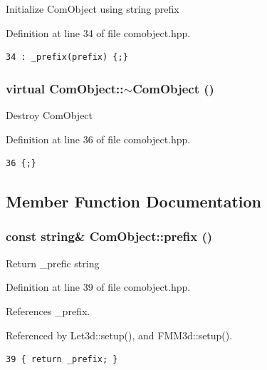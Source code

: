 Initialize Com\-Object using string prefix 

Definition at line 34 of file comobject.hpp.

\footnotesize\begin{verbatim}34 : _prefix(prefix) {;}
\end{verbatim}\normalsize 


\subsubsection{\setlength{\rightskip}{0pt plus 5cm}virtual Com\-Object::$\sim$Com\-Object ()\hspace{0.3cm}{\tt  [inline, virtual]}}\label{classComObject_cf63f06cbc455a408453fe3d9d3dea0a_cf63f06cbc455a408453fe3d9d3dea0a}


Destroy Com\-Object 

Definition at line 36 of file comobject.hpp.

\footnotesize\begin{verbatim}36 {;}
\end{verbatim}\normalsize 




\subsection{Member Function Documentation}
\subsubsection{\setlength{\rightskip}{0pt plus 5cm}const string\& Com\-Object::prefix ()\hspace{0.3cm}{\tt  [inline]}}\label{classComObject_8171d0694121d77c4bfba18e5745faa9_8171d0694121d77c4bfba18e5745faa9}


Return \_\-prefic string 

Definition at line 39 of file comobject.hpp.

References \_\-prefix.

Referenced by Let3d::setup(), and FMM3d::setup().

\footnotesize\begin{verbatim}39 { return _prefix; }  
\end{verbatim}\normalsize 




